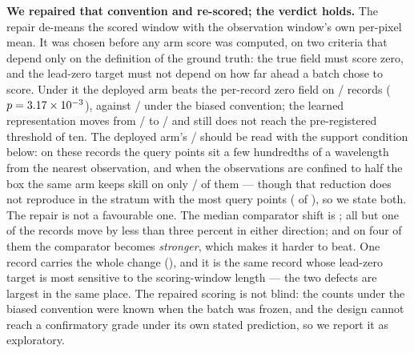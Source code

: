 \documentclass[review]{elsarticle}
\begin{document}
\textbf{We repaired that convention and re-scored; the verdict holds.} The repair
de-means the scored window with the observation window's own per-pixel mean. It was
chosen before any arm score was computed, on two criteria that depend only on the
definition of the ground truth: the true field must score zero, and the lead-zero
target must not depend on how far ahead a batch chose to score. Under it the deployed
arm beats the per-record zero field on \ROneBShipFixed{}/\ROneBN{} records
($p = 3.17\times 10^{-3}{}$), against \ROneBShipOld{}/\ROneBN{} under the biased convention;
the learned representation moves from \ROneBPropOld{}/\ROneBN{} to
\ROneBPropFixed{}/\ROneBN{} and still does not reach the pre-registered threshold of
ten.
The deployed arm's \ROneBShipFixed{}/\ROneBN{} should be read with the support condition
below: on these records the query points sit a few hundredths of a wavelength from the
nearest observation, and when the observations are confined to half the box the same
arm keeps skill on only \REightSkillOut{}/\REightN{} of them --- though that reduction
does not reproduce in the stratum with the most query points (\REightBigW{} of
\REightBigN{}), so we state both. The repair is not a favourable one. The median comparator shift is
\ROneBZeroMed{}; all but one of the \ROneBN{} records move by less than three percent in
either direction; and on four of them the comparator becomes \emph{stronger}, which makes it
harder to beat. One record carries the whole change (\ROneBZeroMax{}), and it is the
same record whose lead-zero target is most sensitive to the scoring-window length ---
the two defects are largest in the same place. The repaired scoring is not blind: the
counts under the biased convention were known when the batch was frozen, and the
design cannot reach a confirmatory grade under its own stated prediction, so we report
it as exploratory.

\end{document}
